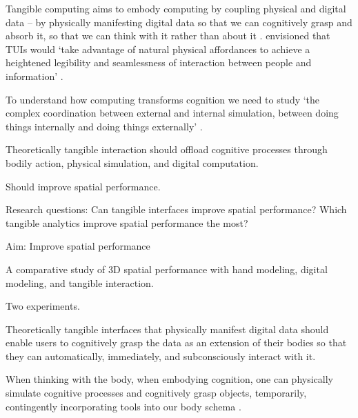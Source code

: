 Tangible computing aims to embody computing 
by coupling physical and digital data \cite{Dourish2001} -- 
by physically manifesting digital data so that we can cognitively grasp and absorb it,
so that we can think with it rather than about it \cite{Kirsh2013}. 
\cite{Ishii1997} envisioned that TUIs would  `take advantage of natural physical affordances to achieve a heightened legibility and seamlessness of interaction between people and information' \cite{Ishii1997}. 

To understand how computing transforms cognition we need to study
`the complex coordination between external and internal simulation, between doing things internally and doing things externally' \cite{Kirsh2013}. %


Theoretically tangible interaction should offload cognitive processes through bodily action, physical simulation, and digital computation.

Should improve spatial performance.

Research questions: 
Can tangible interfaces improve spatial performance?
Which tangible analytics improve spatial performance the most?

Aim: Improve spatial performance

A comparative study of 3D spatial performance with hand modeling, digital modeling, and tangible interaction.

Two experiments. 


















Theoretically tangible interfaces that physically manifest digital data should enable users to cognitively grasp the data as an extension of their bodies so that they can automatically, immediately, and subconsciously interact with it. 


When thinking with the body, when embodying cognition, one can physically simulate cognitive processes and cognitively grasp objects, temporarily, contingently incorporating tools into our body schema \cite{Kirsh2013}.




